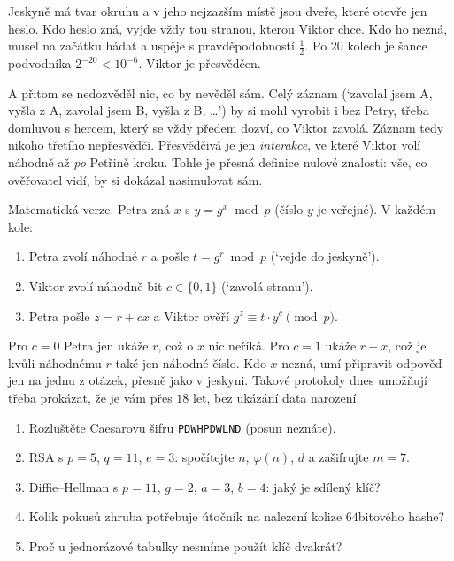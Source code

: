 Jeskyně má tvar okruhu a v jeho nejzazším místě jsou dveře, které otevře jen heslo. Kdo heslo zná, vyjde vždy tou stranou, kterou Viktor chce. Kdo ho nezná, musel na začátku hádat a uspěje s pravděpodobností $\frac{1}{2}$. Po $20$ kolech je šance podvodníka $2^{-20}<10^{-6}$. Viktor je přesvědčen.

A přitom se nedozvěděl nic, co by nevěděl sám. Celý záznam (`zavolal jsem A, vyšla z A, zavolal jsem B, vyšla z B, \dots') by si mohl vyrobit i bez Petry, třeba domluvou s hercem, který se vždy předem dozví, co Viktor zavolá. Záznam tedy nikoho třetího nepřesvědčí. Přesvědčivá je jen \textit{interakce}, ve které Viktor volí náhodně až \textit{po} Petřině kroku. Tohle je přesná definice nulové znalosti: vše, co ověřovatel vidí, by si dokázal nasimulovat sám.

Matematická verze. Petra zná $x$ s $y = g^x\bmod p$ (číslo $y$ je veřejné). V každém kole:
\begin{enumerate}
  \item Petra zvolí náhodné $r$ a pošle $t = g^r\bmod p$ (`vejde do jeskyně').
  \item Viktor zvolí náhodně bit $c\in\{0, 1\}$ (`zavolá stranu').
  \item Petra pošle $z = r + cx$ a Viktor ověří $g^z\equiv t\cdot y^c\pmod p$.
\end{enumerate}
Pro $c = 0$ Petra jen ukáže $r$, což o $x$ nic neříká. Pro $c = 1$ ukáže $r + x$, což je kvůli náhodnému $r$ také jen náhodné číslo. Kdo $x$ nezná, umí připravit odpověď jen na jednu z otázek, přesně jako v jeskyni. Takové protokoly dnes umožňují třeba prokázat, že je vám přes $18$ let, bez ukázání data narození.

\begin{problem}
  \begin{enumerate}[label=(\alph*)]
    \item Rozluštěte Caesarovu šifru \texttt{PDWHPDWLND} (posun neznáte).
    \item RSA s $p = 5$, $q = 11$, $e = 3$: spočítejte $n$, $\varphi(n)$, $d$ a zašifrujte $m = 7$.
    \item Diffie--Hellman s $p = 11$, $g = 2$, $a = 3$, $b = 4$: jaký je sdílený klíč?
    \item Kolik pokusů zhruba potřebuje útočník na nalezení kolize $64$bitového hashe?
    \item Proč u jednorázové tabulky nesmíme použít klíč dvakrát?
  \end{enumerate}
\end{problem}

